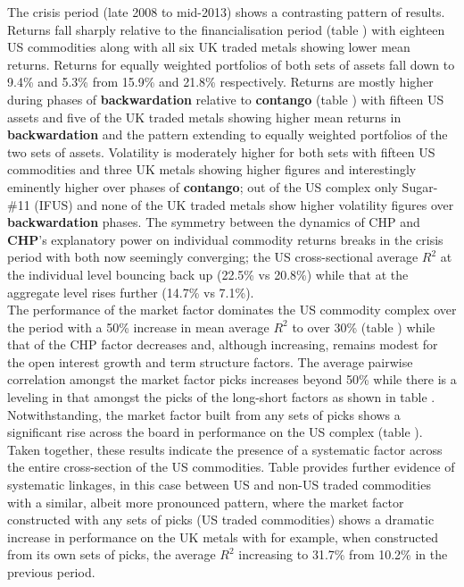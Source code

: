 \documentclass[
  authoryear,
  preprint,
  3p]{elsarticle}
\begin{document}
The crisis period (late 2008 to mid-2013) shows a contrasting pattern of
results. Returns fall sharply relative to the financialisation period
(table ) with eighteen US commodities along with all six UK traded
metals showing lower mean returns. Returns for equally weighted
portfolios of both sets of assets fall down to 9.4\% and 5.3\% from
15.9\% and 21.8\% respectively. Returns are mostly higher during phases
of \textbf{backwardation} relative to \textbf{contango} (table ) with
fifteen US assets and five of the UK traded metals showing higher mean
returns in \textbf{backwardation} and the pattern extending to equally
weighted portfolios of the two sets of assets. Volatility is moderately
higher for both sets with fifteen US commodities and three UK metals
showing higher figures and interestingly eminently higher over phases of
\textbf{contango}; out of the US complex only Sugar-\#11 (IFUS) and none
of the UK traded metals show higher volatility figures over
\textbf{backwardation} phases. The symmetry between the dynamics of CHP
and \textbf{CHP}'s explanatory power on individual commodity returns
breaks in the crisis period with both now seemingly converging; the US
cross-sectional average \(R^{2}\) at the individual level bouncing back
up (22.5\% vs 20.8\%) while that at the aggregate level rises further
(14.7\% vs 7.1\%).\\
The performance of the market factor dominates the US commodity complex
over the period with a 50\% increase in mean average \(R^{2}\) to over
30\% (table ) while that of the CHP factor decreases and, although
increasing, remains modest for the open interest growth and term
structure factors. The average pairwise correlation amongst the market
factor picks increases beyond 50\% while there is a leveling in that
amongst the picks of the long-short factors as shown in table .
Notwithstanding, the market factor built from any sets of picks shows a
significant rise across the board in performance on the US complex
(table ).\\
Taken together, these results indicate the presence of a systematic
factor across the entire cross-section of the US commodities. Table
provides further evidence of systematic linkages, in this case between
US and non-US traded commodities with a similar, albeit more pronounced
pattern, where the market factor constructed with any sets of picks (US
traded commodities) shows a dramatic increase in performance on the UK
metals with for example, when constructed from its own sets of picks,
the average \(R^{2}\) increasing to 31.7\% from 10.2\% in the previous
period.
\end{document}
